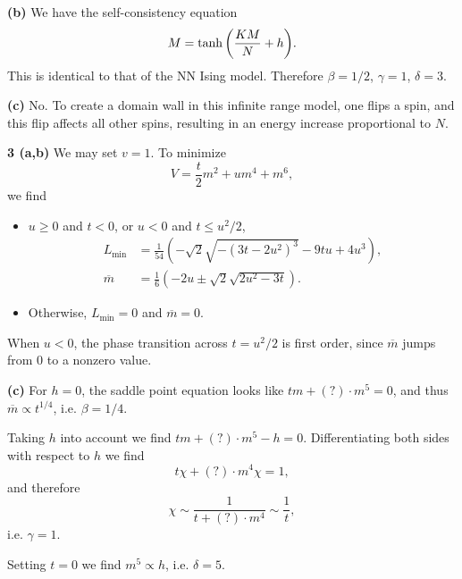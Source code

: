 \documentclass{article}
\makeatletter
\newcommand*{\shifttext}[1]{%
  \settowidth{\@tempdima}{#1}%
  \hspace{-\@tempdima}#1%
}
\newcommand{\plabel}[1]{%
\shifttext{\textbf{#1}\quad}%
}
\newcommand{\prule}{%
\begin{center}%
\hdashrule[0.5ex]{.99\linewidth}{1pt}{1pt 2.5pt}%
\end{center}%
}
\makeatother
\begin{document}
\plabel{(b)}%
We have the self-consistency equation
\[ M = \tanh\qty(\frac{KM}{N} + h). \]
This is identical to that of the NN Ising model.
Therefore $\beta = 1/2$, $\gamma = 1$, $\delta = 3$.

\plabel{(c)}%
No.
To create a domain wall in this infinite range model, one flips a spin,
and this flip affects all other spins, resulting in an energy increase proportional to $N$.

\prule

\plabel{3 (a,b)}%
We may set $v=1$.
To minimize
\[ V = \frac{t}{2} m^2 + u m^4 + m^6, \]
we find
\begin{itemize}
    \item $u\ge 0$ and $t<0$, or $u<0$ and $t \le u^2/2$,
    \begin{align*}
        L_{\text{min}} &= \frac{1}{54} \left(-\sqrt{2} \sqrt{-\left(3 t-2 u^2\right)^3}-9 t u+4 u^3\right), \\
        \overline{m} &= \frac{1}{6} \left(-2u \pm\sqrt{2} \sqrt{2 u^2-3 t}\right).
    \end{align*}
    \item Otherwise, $L_{\text{min}} = 0$ and $\overline{m} = 0$.
\end{itemize}
When $u<0$, the phase transition across $t=u^2/2$ is first order, since $\overline{m}$ jumps from $0$ to a nonzero value.

\begin{center}
\end{center}

\plabel{(c)}%
For $h=0$, the saddle point equation looks like $t m + (?) \cdot m^5 = 0$, and thus $\overline{m} \propto t^{1/4}$, i.e. $\beta = 1/4$.
\par
Taking $h$ into account we find $t m + (?) \cdot m^5 - h = 0$.
Differentiating both sides with respect to $h$ we find
\[ t \chi + (?) \cdot m^4 \chi = 1, \]
and therefore
\[ \chi \sim \frac{1}{t + (?)\cdot m^4} \sim \frac{1}{t}, \]
i.e. $\gamma = 1$.
\par
Setting $t=0$ we find $m^5 \propto h$, i.e. $\delta = 5$.
\end{document}
